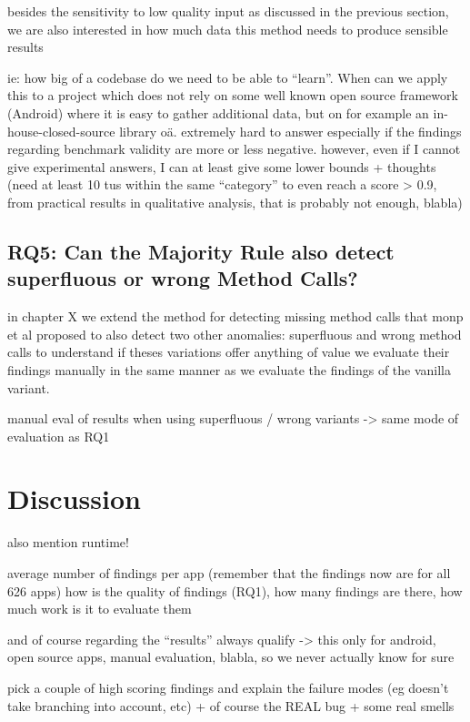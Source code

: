 besides the sensitivity to low quality input as discussed in the previous section, we are also interested in how much data this method needs to produce sensible results

ie: how big of a codebase do we need to be able to ``learn''. When can we apply this to a project which does not rely on some well known open source framework (Android) where it is easy to gather additional data, but on for example an in-house-closed-source library oä.
extremely hard to answer especially if the findings regarding benchmark validity are more or less negative.
however, even if I cannot give experimental answers, I can at least give some lower bounds + thoughts
(need at least 10 tus within the same ``category'' to even reach a score > 0.9, from practical results in qualitative analysis, that is probably not enough, blabla)


\subsection{RQ5: Can the Majority Rule also detect superfluous or wrong Method Calls?}

in chapter X we extend the method for detecting missing method calls that monp et al proposed to also detect two other anomalies:
superfluous and wrong method calls
to understand if theses variations offer anything of value we evaluate their findings manually in the same manner as we evaluate the findings of the vanilla variant.

manual eval of results when using superfluous / wrong variants
-> same mode of evaluation as RQ1

\section{Discussion}

also mention runtime!

average number of findings per app (remember that the findings now are for all 626 apps)
how is the quality of findings (RQ1), how many findings are there, how much work is it to evaluate them

and of course regarding the ``results'' always qualify -> this only for android, open source apps, manual evaluation, blabla, so we never actually know for sure

pick a couple of high scoring findings and explain the failure modes (eg doesn't take branching into account, etc)
+ of course the REAL bug + some real smells

